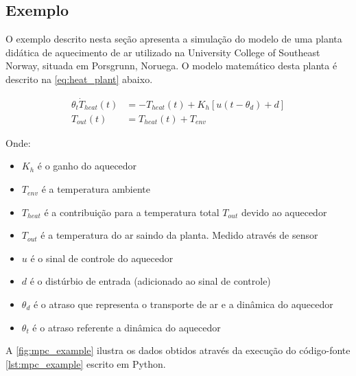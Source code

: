 
\subsection{Exemplo}
\label{subsec:mpc_example}

O exemplo descrito nesta seção apresenta a simulação do modelo de uma planta didática de aquecimento de ar
utilizado na University College of Southeast Norway, situada em Porsgrunn, Noruega. O modelo matemático
desta planta é descrito na \cref{eq:heat_plant} abaixo.

\begin{subequations}
    \label{eq:heat_plant}
    \begin{align}
        {\theta}_t \dot{T}_{heat} (t) &= -T_{heat} (t) + K_h [u(t - {\theta}_d) + d]     \\
        T_{out} (t) &= T_{heat} (t) + T_{env}
    \end{align}
\end{subequations}

\noindent
Onde: 
\begin{itemize}
	\item $K_h$ é o ganho do aquecedor
	\item $T_{env}$ é a temperatura ambiente
	\item $T_{heat}$ é a contribuição para a temperatura total $T_{out}$ devido ao aquecedor
	\item $T_{out}$ é a temperatura do ar saindo da planta. Medido através de sensor
	\item $u$ é o sinal de controle do aquecedor
	\item $d$ é o distúrbio de entrada (adicionado ao sinal de controle)
	\item ${\theta}_d$ é o atraso que representa o transporte de ar e a dinâmica do aquecedor
	\item ${\theta}_t$ é o atraso referente a dinâmica do aquecedor
\end{itemize}

A \cref{fig:mpc_example} ilustra os dados obtidos através da execução do código-fonte \ref{lst:mpc_example}
escrito em Python.

